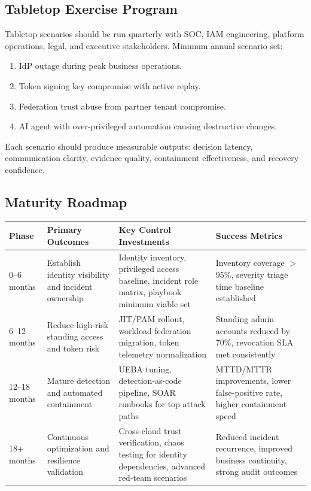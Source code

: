 \documentclass[11pt]{article}
\begin{document}
\subsection{Tabletop Exercise Program}
Tabletop scenarios should be run quarterly with SOC, IAM engineering, platform operations, legal, and executive stakeholders. Minimum annual scenario set:
\begin{enumerate}[leftmargin=1.5em]
    \item IdP outage during peak business operations.
    \item Token signing key compromise with active replay.
    \item Federation trust abuse from partner tenant compromise.
    \item AI agent with over-privileged automation causing destructive changes.
\end{enumerate}
Each scenario should produce measurable outputs: decision latency, communication clarity, evidence quality, containment effectiveness, and recovery confidence.

\subsection{Maturity Roadmap}
\begin{longtable}{p{} p{} p{} p{}}
\toprule
\textbf{Phase} & \textbf{Primary Outcomes} & \textbf{Key Control Investments} & \textbf{Success Metrics} \\
\midrule
\endhead
0--6 months & Establish identity visibility and incident ownership & Identity inventory, privileged access baseline, incident role matrix, playbook minimum viable set & Inventory coverage $>$95\%, severity triage time baseline established \\
6--12 months & Reduce high-risk standing access and token risk & JIT/PAM rollout, workload federation migration, token telemetry normalization & Standing admin accounts reduced by 70\%, revocation SLA met consistently \\
12--18 months & Mature detection and automated containment & UEBA tuning, detection-as-code pipeline, SOAR runbooks for top attack paths & MTTD/MTTR improvements, lower false-positive rate, higher containment speed \\
18+ months & Continuous optimization and resilience validation & Cross-cloud trust verification, chaos testing for identity dependencies, advanced red-team scenarios & Reduced incident recurrence, improved business continuity, strong audit outcomes \\
\bottomrule
\end{longtable}
\end{document}
